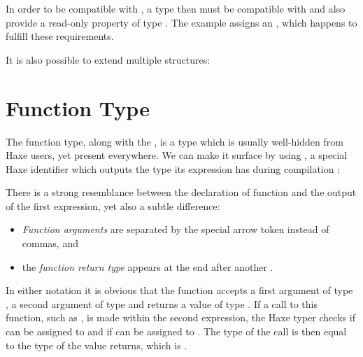 In order to be compatible with , a type then must be compatible with  and also provide a read-only  property of type . The example assigns an , which happens to fulfill these requirements.


It is also possible to extend multiple structures:




\section{Function Type}
\label{types-function}


The function type, along with the , is a type which is usually well-hidden from Haxe users, yet present everywhere. We can make it surface by using , a special Haxe identifier which outputs the type its expression has during compilation :


There is a strong resemblance between the declaration of function  and the output of the first  expression, yet also a subtle difference:

\begin{itemize}
	\item \emph{Function arguments} are separated by the special arrow token \expr{->} instead of commas, and
	\item the \emph{function return type} appears at the end after another \expr{->}.
\end{itemize}

In either notation it is obvious that the function  accepts a first argument of type , a second argument of type  and returns a value of type . If a call to this function, such as , is made within the second  expression, the Haxe typer checks if  can be assigned to  and if  can be assigned to . The type of the call is then equal to the type of the value  returns, which is .

